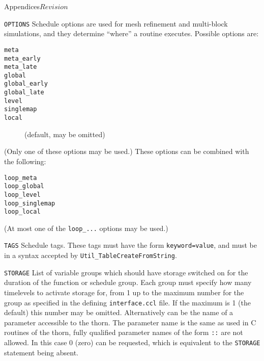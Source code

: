 \begin{cactuspart}{Appendices}{}{$Revision$}
\begin{Lentry}
  \item[\texttt{OPTIONS}] Schedule options are used for mesh
    refinement and multi-block simulations, and they determine
    ``where'' a routine executes. Possible options are:
    \begin{description}
    \item[\texttt{meta}]
    \item[\texttt{meta\_early}]
    \item[\texttt{meta\_late}]
    \item[\texttt{global}]
    \item[\texttt{global\_early}]
    \item[\texttt{global\_late}]
    \item[\texttt{level}]
    \item[\texttt{singlemap}]
    \item[\texttt{local}] (default, may be omitted)
    \end{description}
    (Only one of these options may be used.)
    These options can be combined with the following:
    \begin{description}
    \item[\texttt{loop\_meta}]
    \item[\texttt{loop\_global}]
    \item[\texttt{loop\_level}]
    \item[\texttt{loop\_singlemap}]
    \item[\texttt{loop\_local}]
    \end{description}
    (At most one of the \texttt{loop\_...} options may be used.)

  \item[\texttt{TAGS}] Schedule tags. These tags must have the form
    \texttt{keyword=value}, and must be in a syntax accepted by
    \texttt{Util\_TableCreateFromString}.

  \item[{\tt STORAGE}] List of variable groups which should have storage
  switched on for the duration of the function or schedule group.
  Each group must specify how many timelevels to activate storage for,
  from 1 up to the maximum number for the group as specified in the
  defining {\tt interface.ccl} file. If the maximum is 1 (the default)
  this number may be omitted. Alternatively  can be the
  name of a parameter accessible to the thorn. The parameter name is the
  same as used in C routines of the thorn, fully qualified parameter names
  of the form \texttt{::} are not allowed. In this
  case 0 (zero)  can be requested, which is equivalent to
  the {\tt STORAGE} statement being absent.


\end{Lentry}
\end{cactuspart}
